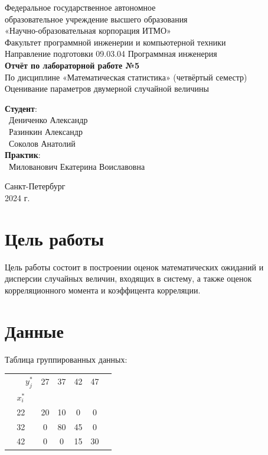 \documentclass{article}
\begin{document}
\begin{center}
    \Large
    Федеральное государственное автономное \\
    образовательное учреждение высшего образования \\ 
    «Научно-образовательная корпорация ИТМО»\\
    \vspace{0.5cm}
    \large
    Факультет программной инженерии и компьютерной техники \\
    Направление подготовки 09.03.04 Программная инженерия \\
    \vspace{1cm}
    \Large
    \textbf{Отчёт по лабораторной работе №5} \\
    По дисциплине «Математическая статистика» (четвёртый семестр)\\
    Оценивание параметров двумерной случайной величины\\
    \large
    \vspace{8cm}

    \begin{minipage}{.33\textwidth}
    \end{minipage}
    \hfill
    \begin{minipage}{.4\textwidth}
    
        \textbf{Студент}: \vspace{.1cm} \\
        \ Дениченко Александр\\
        \ Разинкин Александр\\
        \ Соколов Анатолий\\
        \textbf{Практик}:  \\
        \ Милованович Екатерина Воиславовна
    \end{minipage}
    \vfill
Санкт-Петербург\\ 2024 г.
\end{center}
\thispagestyle{empty}

\newpage
\section*{Цель работы}
Цель работы состоит в построении оценок математических ожиданий и дисперсии случайных величин, входящих в систему, а также оценок корреляционного момента и коэффицента корреляции.
\section*{Данные }
Таблица группированных данных:
\begin{table}[H]
    \centering
    \begin{tabular}{|c|c|c|c|c|c|}
    \hline
     \ \ \ \ $y_j^*$&  27&  37&  42& 47\\
    $x_i^*$&  &  &  & \\
    \hline
    22&  20&  10&  0& 0\\
    \hline
    32&  0&  80&  45& 0\\
    \hline
    42&  0&  0&  15& 30\\
    \hline
    \end{tabular}
\end{table}
\end{document}

